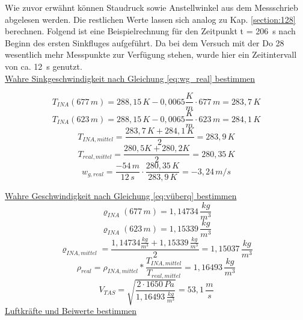 \noindent Wie zuvor erwähnt können Staudruck sowie Anstellwinkel aus dem Messschrieb abgelesen werden. Die restlichen Werte lassen sich analog zu Kap. \ref{section:128} berechnen. Folgend ist eine Beispielrechnung für den Zeitpunkt t = 206~s nach Beginn des ersten Sinkfluges aufgeführt. Da bei dem Versuch mit der Do 28 wesentlich mehr Messpunkte zur Verfügung stehen, wurde hier ein Zeitintervall von ca. 12~s genutzt. \\

\noindent 
\underline{Wahre Sinkgeschwindigkeit nach Gleichung \ref{eq:wg_real} bestimmen}

\begin{equation*}
T_{INA}(677\,m) = 288,15\,K - 0,0065 \frac{K}{m} \cdot 677\,m = 283,7\,K
\end{equation*}
\begin{equation*}
T_{INA}(623\,m) = 288,15\,K - 0,0065 \frac{K}{m} \cdot 623\,m = 284,1\,K
\end{equation*}
\begin{equation*}
T_{INA,mittel} = \frac{283,7\,K + 284,1\,K}{2} = 283,9\,K
\end{equation*}
\begin{equation*}
T_{real,mittel} = \frac{280,5 K + 280,2 K}{2} =	280,35\,K
\end{equation*}
\begin{equation*}
w_{g,real} = \frac{-54\,m}{12\,s} \cdot \frac{280,35\,K}{283,9\,K} = - 3,24\,m/s
\end{equation*}

\vspace{5mm}


\noindent
\underline{Wahre Geschwindigkeit nach Gleichung \ref{eq:vüberq} bestimmen}
\begin{equation*}
\varrho_{INA}(677\,m) = 1,14734\,\frac{kg}{m^3}
\end{equation*}
\begin{equation*}
\varrho_{INA}(623\,m) = 1,15339\,\frac{kg}{m^3}
\end{equation*}
\begin{equation*}
\varrho_{INA,mittel} = \frac{1,14734\frac{kg}{m^3} + 1,15339\,\frac{kg}{m^3}}{2} = 1,15037\,\frac{kg}{m^3}
\end{equation*}
\begin{equation*}
\rho_{real} = \rho_{INA,mittel} * \frac{T_{INA,mittel}}{T_{real,mittel}} = 1,16493\,\frac{kg}{m^3}
\end{equation*}
\vspace{5mm}
\begin{equation*}
V_{TAS} = \sqrt{\frac{2 \cdot 1650\,Pa}{1,16493\,\frac{kg}{m^3}}} = 53,1 \,\frac{m}{s}
\end{equation*}
\newpage 
\noindent
\underline{Luftkräfte und Beiwerte bestimmen}

